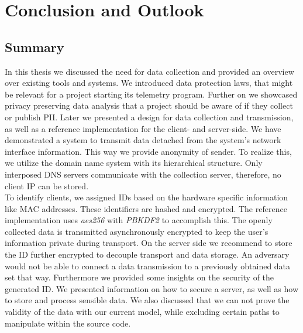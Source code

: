 \chapter{Conclusion and Outlook}
\label{chap:conclusion}
\section{Summary}
In this thesis we discussed the need for data collection and provided an overview over existing tools and systems. We introduced data protection laws, that might be relevant for a project starting its telemetry program. Further on we showcased privacy preserving data analysis that a project should be aware of if they collect or publish PII. 
Later we presented a design for data collection and transmission, as well as a reference implementation for the client- and server-side. We have demonstrated a system to transmit data
detached from the system's network interface information. This way we provide anonymity of sender. 
To realize this, we utilize the domain name system with its hierarchical structure. Only interposed DNS servers communicate with the collection server, therefore, no client IP can be stored.\\
To identify clients, we assigned IDs based on the hardware specific information like MAC addresses. These identifiers are hashed and encrypted. The reference implementation uses \textit{aes256} with \textit{PBKDF2} to accomplish this. The openly collected data is transmitted asynchronously encrypted to keep the user's information private during transport.
On the server side we recommend to store the ID further encrypted to decouple transport and data storage. An adversary would not be able to connect a data transmission to a previously obtained data set that way. Furthermore we provided some insights on the security of the generated ID.
We presented information on how to secure a server, as well as how to store and process sensible data.
We also discussed that we can not prove the validity of the data with our current model, while excluding certain paths to manipulate within the source code.



%



